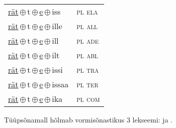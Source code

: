\begin{minipage}{\textwidth}
\begin{sideways}
\begin{tabular}{l l}
\underline{rät}\,$\oplus$\,t\,$\oplus$\,\underline{e}\,$\oplus$\,iss & \textsc{ pl ela } \\
\underline{rät}\,$\oplus$\,t\,$\oplus$\,\underline{e}\,$\oplus$\,ille & \textsc{ pl all } \\
\underline{rät}\,$\oplus$\,t\,$\oplus$\,\underline{e}\,$\oplus$\,ill & \textsc{ pl ade } \\
\underline{rät}\,$\oplus$\,t\,$\oplus$\,\underline{e}\,$\oplus$\,ilt & \textsc{ pl abl } \\
\underline{rät}\,$\oplus$\,t\,$\oplus$\,\underline{e}\,$\oplus$\,issi & \textsc{ pl tra } \\
\underline{rät}\,$\oplus$\,t\,$\oplus$\,\underline{e}\,$\oplus$\,issaa & \textsc{ pl ter } \\
\underline{rät}\,$\oplus$\,t\,$\oplus$\,\underline{e}\,$\oplus$\,ika & \textsc{ pl com } \\
\end{tabular}
\end{sideways}
\label{tab:tüüpsõnamall-rätte}

\end{minipage}

 
\vspace{1em}
\noindent Tüüpsõnamall  hõlmab vormisõnastikus 3 lekseemi:  ja .
